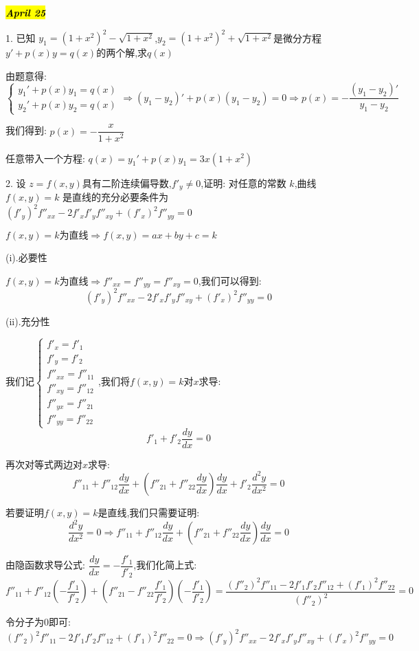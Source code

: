 \hl{\textbf{\textit{April 25}}}

1. 已知 $y_{1}=(1+x^2)^2-\sqrt{1+x^2}$,$y_{2}=(1+x^2)^2+\sqrt{1+x^2}$是微分方程$y'+p(x)y=q(x)$的两个解,求$q(x)$
\begin{solution}
	
	由题意得: 
	$$\left\lbrace 
	\begin{array}{l}
		y_{1}'+p(x)y_{1}=q(x)\\
		y_{2}'+p(x)y_{2}=q(x)
	\end{array}
	\right. \Rightarrow (y_{1}-y_{2})'+p(x)(y_{1}-y_{2})=0\Rightarrow p(x)=-\dfrac{(y_{1}-y_{2})'}{y_{1}-y_{2}}$$
	
	我们得到: $p(x)=-\dfrac{x}{1+x^2}$
	
	任意带入一个方程: $q(x)=y_{1}'+p(x)y_{1}=3x(1+x^2)$
\end{solution}

2. 设 $z=f(x,y)$具有二阶连续偏导数,$f'_{y}\neq 0$,证明: 对任意的常数 $k$,曲线$f(x,y)=k$ 是直线的充分必要条件为$(f'_{y})^2f''_{xx}-2f'_{x}f'_{y}f''_{xy}+(f'_{x})^2f''_{yy}=0$
\begin{solution}
	
	$f(x,y)=k\text{为直线}\Rightarrow f(x,y)=ax+by+c=k$
	
	(i).必要性
	
	$f(x,y)=k\text{为直线}\Rightarrow f''_{xx}=f''_{yy}=f''_{xy}=0$,我们可以得到: $$(f'_{y})^2f''_{xx}-2f'_{x}f'_{y}f''_{xy}+(f'_{x})^2f''_{yy}=0$$
	
	(ii).充分性
	
	我们记$\left\lbrace 
	\begin{array}{l}
		f'_{x}=f'_{1}\\
		f'_{y}=f'_{2}\\
		f''_{xx}=f''_{11}\\
		f''_{xy}=f''_{12}\\
		f''_{yx}=f''_{21}\\
		f''_{yy}=f''_{22}
	\end{array}
	\right. $,我们将$f(x,y)=k$对$x$求导: 
	$$f'_{1}+f'_{2}\frac{dy}{dx}=0$$
	
	再次对等式两边对$x$求导: 
	$$f''_{11}+f''_{12}\frac{dy}{dx}+(f''_{21}+f''_{22}\frac{dy}{dx})\frac{dy}{dx}+f'_{2}\frac{d^2y}{dx^2}=0$$
	
	若要证明$f(x,y)=k$是直线,我们只需要证明: 
	$$\frac{d^2y}{dx^2}=0\Rightarrow f''_{11}+f''_{12}\frac{dy}{dx}+(f''_{21}+f''_{22}\frac{dy}{dx})\frac{dy}{dx}=0$$
	
	由隐函数求导公式: $\dfrac{dy}{dx}=-\dfrac{f'_{1}}{f'_{2}}$,我们化简上式: 
	$$f''_{11}+f''_{12}(-\frac{f'_{1}}{f'_{2}})+(f''_{21}-f''_{22}\frac{f'_{1}}{f'_{2}})(-\frac{f'_{1}}{f'_{2}})=\frac{(f''_{2})^2f''_{11}-2f'_{1}f'_{2}f''_{12}+(f'_{1})^2f''_{22}}{(f''_{2})^2}=0$$
	
	令分子为$0$即可: 
	$$(f''_{2})^2f''_{11}-2f'_{1}f'_{2}f''_{12}+(f'_{1})^2f''_{22}=0\Rightarrow(f'_{y})^2f''_{xx}-2f'_{x}f'_{y}f''_{xy}+(f'_{x})^2f''_{yy}=0$$
\end{solution}

